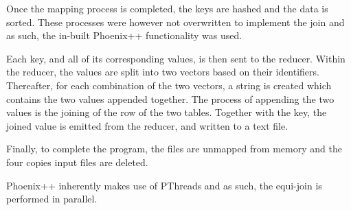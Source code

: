\documentclass[10pt,twocolumn]{witseiepaper}
\begin{document}
Once the mapping process is completed, the keys are hashed and the data is sorted. These processes were however not overwritten to implement the join and as such, the in-built Phoenix++ functionality was used.

Each key, and all of its corresponding values, is then sent to the reducer. Within the reducer, the values are split into two vectors based on their identifiers. Thereafter, for each combination of the two vectors, a string is created which contains the two values appended together. The process of appending the two values is the joining of the row of the two tables. Together with the key, the joined value is emitted from the reducer, and written to a text file.

Finally, to complete the program, the files are unmapped from memory and the four copies input files are deleted.

Phoenix++ inherently makes use of PThreads and as such, the equi-join is performed in parallel.
\end{document}
